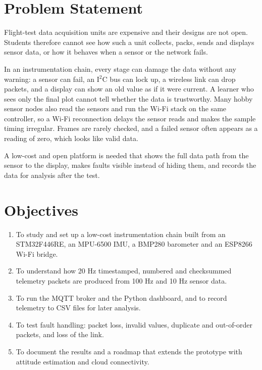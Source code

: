 \documentclass[12pt,a4paper]{report}
\begin{document}
\section{Problem Statement}
Flight-test data acquisition units are expensive and their designs are not open. Students therefore cannot see how such a unit collects, packs, sends and displays sensor data, or how it behaves when a sensor or the network fails.

In an instrumentation chain, every stage can damage the data without any warning: a sensor can fail, an I$^2$C bus can lock up, a wireless link can drop packets, and a display can show an old value as if it were current. A learner who sees only the final plot cannot tell whether the data is trustworthy. Many hobby sensor nodes also read the sensors and run the Wi-Fi stack on the same controller, so a Wi-Fi reconnection delays the sensor reads and makes the sample timing irregular. Frames are rarely checked, and a failed sensor often appears as a reading of zero, which looks like valid data.

A low-cost and open platform is needed that shows the full data path from the sensor to the display, makes faults visible instead of hiding them, and records the data for analysis after the test.

\section{Objectives}
\begin{enumerate}
\item To study and set up a low-cost instrumentation chain built from an STM32F446RE, an MPU-6500 IMU, a BMP280 barometer and an ESP8266 Wi-Fi bridge.
\item To understand how 20 Hz timestamped, numbered and checksummed telemetry packets are produced from 100 Hz and 10 Hz sensor data.
\item To run the MQTT broker and the Python dashboard, and to record telemetry to CSV files for later analysis.
\item To test fault handling: packet loss, invalid values, duplicate and out-of-order packets, and loss of the link.
\item To document the results and a roadmap that extends the prototype with attitude estimation and cloud connectivity.
\end{enumerate}
\end{document}
